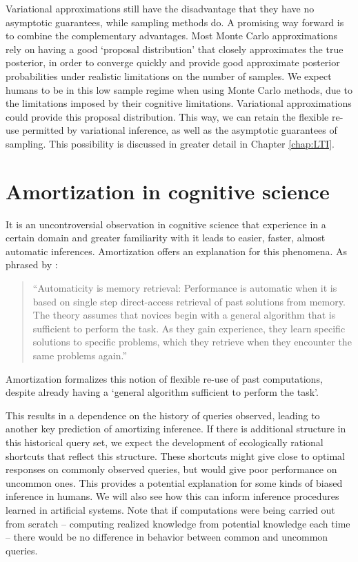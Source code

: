 Variational approximations still have the disadvantage that they have no asymptotic guarantees, while sampling methods do. A promising way forward is to combine the complementary advantages. Most Monte Carlo approximations rely on having a good `proposal distribution' that closely approximates the true posterior, in order to converge quickly and provide good approximate posterior probabilities under realistic limitations on the number of samples. We expect humans to be in this low sample regime when using Monte Carlo methods, due to the limitations imposed by their cognitive limitations. Variational approximations could provide this proposal distribution. This way, we can retain the flexible re-use permitted by variational inference, as well as the asymptotic guarantees of sampling. This possibility is discussed in greater detail in Chapter \ref{chap:LTI}.

\section{Amortization in cognitive science}

It is an uncontroversial observation in cognitive science that experience in a certain domain and greater familiarity with it leads to easier, faster, almost automatic inferences. Amortization offers an explanation for this phenomena. As phrased by \citet{logan1988toward}:
\begin{quote}
``Automaticity is memory retrieval: Performance is automatic when it is based on single step direct-access retrieval of past solutions from memory. The theory assumes that novices begin with a general algorithm that is sufficient to perform the task. As they gain experience, they learn specific solutions to specific problems, which they retrieve when they encounter the same problems again.''
\end{quote}
Amortization formalizes this notion of flexible re-use of past computations, despite already having a `general algorithm sufficient to perform the task'.

This results in a dependence on the history of queries observed, leading to another key prediction of amortizing inference. If there is additional structure in this historical query set, we expect the development of ecologically rational shortcuts that reflect this structure. These shortcuts might give close to optimal responses on commonly observed queries, but would give poor performance on uncommon ones. This provides a potential explanation for some kinds of biased inference in humans. We will also see how this can inform inference procedures learned in artificial systems. Note that if computations were being carried out from scratch -- computing realized knowledge from potential knowledge each time -- there would be no difference in behavior between common and uncommon queries.

